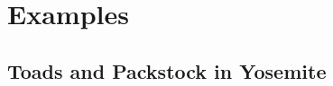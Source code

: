 \documentclass{beamer}
\begin{document}
%
%
%

\section[Examples]{Examples}

\subsection[Toads and Packstock in Yosemite]{Toads and Packstock in Yosemite}
\end{document}
